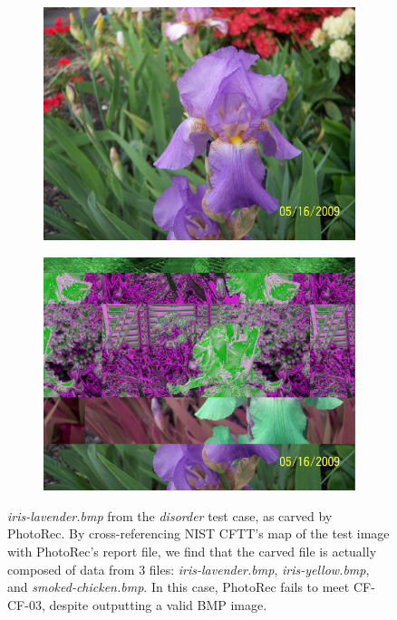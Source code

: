 \begin{figure}
    \centering
    \begin{subfigure}{0.45\linewidth}
        \includegraphics[width=\linewidth]{fig/iris-lavender.jpg}
    \end{subfigure}
    \begin{subfigure}{0.45\linewidth}
        \includegraphics[width=\linewidth]{fig/CR3_fail.png}
    \end{subfigure}
    \caption{
        \emph{iris-lavender.bmp} from the \emph{disorder} test case, as carved by PhotoRec.
        By cross-referencing NIST CFTT's map of the test image with PhotoRec's report file, we find  that the carved file is actually composed of data from 3 files: \emph{iris-lavender.bmp}, \emph{iris-yellow.bmp}, and \emph{smoked-chicken.bmp}.
        In this case, PhotoRec fails to meet CF-CF-03, despite outputting a valid BMP image.
        }
    \label{fig:CR3_fail}
\end{figure}

